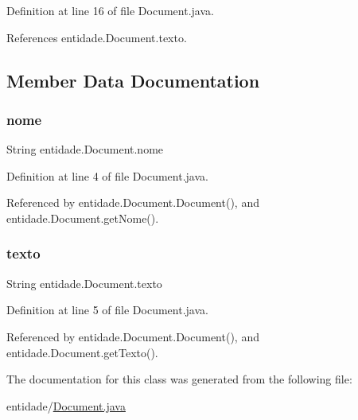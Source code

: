 Definition at line 16 of file Document.\+java.



References entidade.\+Document.\+texto.



\subsection{Member Data Documentation}
\hypertarget{classentidade_1_1Document_ad19a8ea43a8ed7f3a418f7546fa4cd5c}{}\label{classentidade_1_1Document_ad19a8ea43a8ed7f3a418f7546fa4cd5c} 
\subsubsection{\texorpdfstring{nome}{nome}}
{\footnotesize\ttfamily String entidade.\+Document.\+nome\hspace{0.3cm}{\ttfamily [private]}}



Definition at line 4 of file Document.\+java.



Referenced by entidade.\+Document.\+Document(), and entidade.\+Document.\+get\+Nome().

\hypertarget{classentidade_1_1Document_a13324b3f331d617f95a64ad0ff958a94}{}\label{classentidade_1_1Document_a13324b3f331d617f95a64ad0ff958a94} 
\subsubsection{\texorpdfstring{texto}{texto}}
{\footnotesize\ttfamily String entidade.\+Document.\+texto\hspace{0.3cm}{\ttfamily [private]}}



Definition at line 5 of file Document.\+java.



Referenced by entidade.\+Document.\+Document(), and entidade.\+Document.\+get\+Texto().



The documentation for this class was generated from the following file\+:\begin{DoxyCompactItemize}
\item 
entidade/\hyperlink{Document_8java}{Document.\+java}\end{DoxyCompactItemize}
